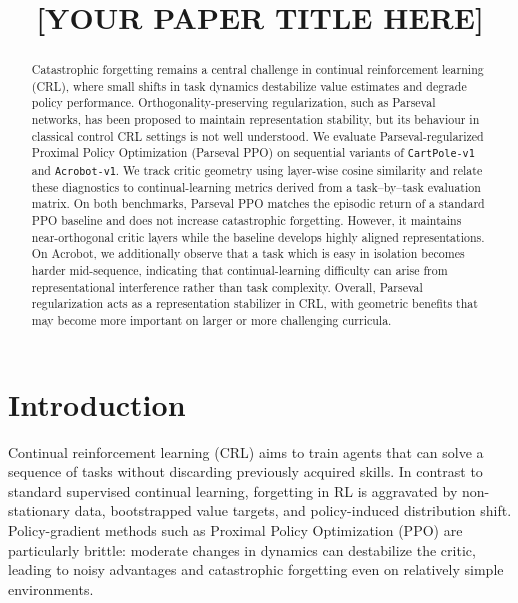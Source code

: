 \documentclass[conference]{IEEEtran}
\begin{document}
\title{[YOUR PAPER TITLE HERE]}
\author{}
\maketitle

\begin{abstract}
Catastrophic forgetting remains a central challenge in continual reinforcement learning (CRL), where small shifts in task dynamics destabilize value estimates and degrade policy performance. Orthogonality-preserving regularization, such as Parseval networks, has been proposed to maintain representation stability, but its behaviour in classical control CRL settings is not well understood.
We evaluate Parseval-regularized Proximal Policy Optimization (Parseval PPO) on sequential variants of \texttt{CartPole-v1} and \texttt{Acrobot-v1}. We track critic geometry using layer-wise cosine similarity and relate these diagnostics to continual-learning metrics derived from a task--by--task evaluation matrix. On both benchmarks, Parseval PPO matches the episodic return of a standard PPO baseline and does not increase catastrophic forgetting. However, it maintains near-orthogonal critic layers while the baseline develops highly aligned representations. On Acrobot, we additionally observe that a task which is easy in isolation becomes harder mid-sequence, indicating that continual-learning difficulty can arise from representational interference rather than task complexity. Overall, Parseval regularization acts as a representation stabilizer in CRL, with geometric benefits that may become more important on larger or more challenging curricula.
\end{abstract}

\section{Introduction}

Continual reinforcement learning (CRL) aims to train agents that can solve a sequence of tasks without discarding previously acquired skills. In contrast to standard supervised continual learning, forgetting in RL is aggravated by non-stationary data, bootstrapped value targets, and policy-induced distribution shift. Policy-gradient methods such as Proximal Policy Optimization (PPO) are particularly brittle: moderate changes in dynamics can destabilize the critic, leading to noisy advantages and catastrophic forgetting even on relatively simple environments.
\end{document}
